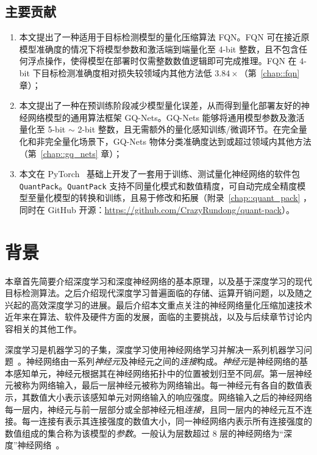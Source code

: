 \documentclass[
  fontset = mac,
]{shtthesis}
\begin{document}
\section{主要贡献}
\begin{enumerate}
  \item 本文提出了一种适用于目标检测模型的量化压缩算法 FQN。FQN 可在接近原模型准确度的情况下将模型参数和激活端到端量化至 4-bit 整数，且不包含任何浮点操作，使得模型在部署时仅需整数数值逻辑即可完成推理。FQN 在 4-bit 下目标检测准确度相对损失较领域内其他方法低 $3.84\times$（第~\ref{chap::fqn} 章）；
  \item 本文提出了一种在预训练阶段减少模型量化误差，从而得到量化部署友好的神经网络模型的通用算法框架 GQ-Nets。GQ-Nets 能够将通用模型参数及激活量化至 5-bit $\sim$ 2-bit 整数，且无需额外的量化感知训练/微调环节。在完全量化和非完全量化场景下，GQ-Nets 物体分类准确度达到或超过领域内其他方法（第~\ref{chap::gq_nets} 章）；
  \item 本文在 PyTorch~\citep{paszke2019pytorch} 基础上开发了一套用于训练、测试量化神经网络的软件包 \verb|QuantPack|。\verb|QuantPack| 支持不同量化模式和数值精度，可自动完成全精度模型至量化模型的转换和训练，且易于修改和拓展（附录~\ref{chap::quant_pack} ，同时在 GitHub 开源：\url{https://github.com/CrazyRundong/quant-pack}）。
\end{enumerate}
\chapter{背景} \label{chap::background}
本章首先简要介绍深度学习和深度神经网络的基本原理，以及基于深度学习的现代目标检测算法。之后介绍现代深度学习普遍面临的存储、运算开销问题，以及随之兴起的高效深度学习的进展。最后介绍本文重点关注的神经网络量化压缩加速技术近年来在算法、软件及硬件方面的发展，面临的主要挑战，以及与后续章节讨论内容相关的其他工作。

深度学习是机器学习的子集，深度学习使用神经网络学习并解决一系列机器学习问题~\citep{lecun2015deep}。神经网络由一系列\emph{神经元}及神经元之间的\emph{连接}构成。\emph{神经元}是神经网络的基本感知单元，神经元根据其在神经网络拓扑中的位置被划归至不同\emph{层}。第一层神经元被称为网络输入，最后一层神经元被称为网络输出。每一神经元有各自的数值表示，其数值大小表示该感知单元对网络输入的响应强度。网络输入之后的神经网络每一层内，神经元与前一层部分或全部神经元相\emph{连接}，且同一层内的神经元互不连接。每一连接有表示其连接强度的数值大小，同一神经网络内表示所有连接强度的数值组成的集合称为该模型的\emph{参数}。一般认为层数超过 8 层的神经网络为“深度”神经网络~\citep{krizhevsky2012imagenet}。
\end{document}
